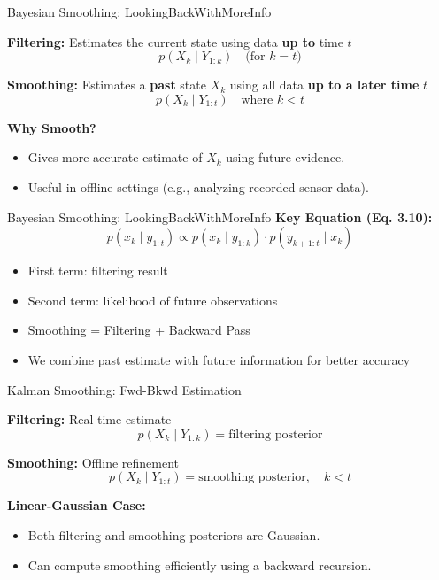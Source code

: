 \documentclass[handout,aspectratio=169]{beamer}
\begin{document}
\begin{frame}{Bayesian Smoothing: LookingBackWithMoreInfo}

\textbf{Filtering:} Estimates the current state using data \textbf{up to} time \( t \)
\[
p(X_k \mid Y_{1:k}) \quad \text{(for } k = t\text{)}
\]

\textbf{Smoothing:} Estimates a \textbf{past} state \( X_k \) using all data \textbf{up to a later time} \( t \)
\[
p(X_k \mid Y_{1:t}) \quad \text{where } k < t
\]

\textbf{Why Smooth?}
\begin{itemize}
  \item Gives more accurate estimate of \( X_k \) using future evidence.
  \item Useful in offline settings (e.g., analyzing recorded sensor data).
\end{itemize}
\end{frame}

\begin{frame}{Bayesian Smoothing: LookingBackWithMoreInfo}
\textbf{Key Equation (Eq. 3.10):} $$p(x_k \mid y_{1:t}) \propto p(x_k \mid y_{1:k}) \cdot p(y_{k+1:t} \mid x_k)$$
\begin{itemize}
  \item First term: filtering result
  \item Second term: likelihood of future observations
  \item Smoothing = Filtering + Backward Pass
  \item We combine past estimate with future information for better accuracy
\end{itemize}


\end{frame}

\begin{frame}{Kalman Smoothing: Fwd-Bkwd Estimation}

\textbf{Filtering:} Real-time estimate
\[
p(X_k \mid Y_{1:k}) = \text{filtering posterior}
\]

\textbf{Smoothing:} Offline refinement
\[
p(X_k \mid Y_{1:t}) = \text{smoothing posterior}, \quad k < t
\]

\vspace{1em}
\textbf{Linear-Gaussian Case:}
\begin{itemize}
  \item Both filtering and smoothing posteriors are Gaussian.
  \item Can compute smoothing efficiently using a backward recursion.
\end{itemize}
\end{frame}
\end{document}
